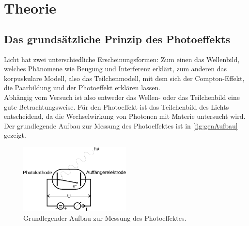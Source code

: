 \section{Theorie}
\label{sec:theorie}

\subsection{Das grundsätzliche Prinzip des Photoeffekts}

    Licht hat zwei unterschiedliche Erscheinungsformen:
    Zum einen das Wellenbild,
    welches Phänomene wie Beugung und Interferenz erklärt,
    zum anderen das korpuskulare Modell,
    also das Teilchenmodell,
    mit dem sich der Compton-Effekt, die Paarbildung und der Photoeffekt erklären lassen.\\
    Abhängig vom Versuch ist also entweder das Wellen- oder das Teilchenbild eine gute Betrachtungsweise.
    Für den Photoeffekt ist das Teilchenbild des Lichts entscheidend,
    da die Wechselwirkung von Photonen mit Materie untersucht wird.\\
    Der grundlegende Aufbau zur Messung des Photoeffektes ist in \autoref{fig:genAufbau} gezeigt.

    \begin{figure}
        \centering
        \includegraphics[width=0.5\textwidth]{content/img/Abb_1.pdf}
        \caption{Grundlegender Aufbau zur Messung des Photoeffektes. \cite{versuchsanleitung}}
        \label{fig:genAufbau}
    \end{figure}

